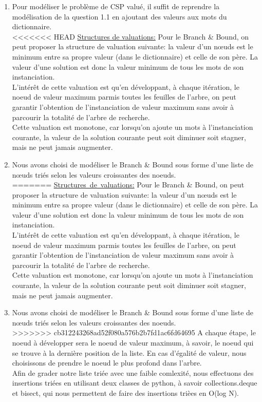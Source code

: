 \documentclass[a4paper,12pt]{report}
\begin{document}
\begin{enumerate}

\item Pour modéliser le problème de CSP valué, il suffit de reprendre la modélisation de la question 1.1 en ajoutant des valeurs aux mots du dictionnaire.\\
<<<<<<< HEAD
\ul{Structures de valuations:} Pour le Branch \& Bound, on peut proposer la structure de valuation suivante: la valeur d'un nœuds est le minimum entre sa propre valeur (dans le dictionnaire) et celle de son père. La valeur d'une solution est donc la valeur minimum de tous les mots de son instanciation.\\
L'intérêt de cette valuation est qu'en développant, à chaque itération, le noeud de valeur maximum parmis toutes les feuilles de l'arbre, on peut garantir l'obtention de l'instanciation de valeur maximum sans avoir à parcourir la totalité de l'arbre de recherche.\\
Cette valuation est monotone, car lorsqu'on ajoute un mots à l'instanciation courante, la valeur de la solution courante peut soit diminuer soit stagner, mais ne peut jamais augmenter.\\

\item Nous avons choisi de modéliser le Branch \& Bound sous forme d'une liste de nœuds triés selon les valeurs croissantes des noeuds.\\
=======
\ul{Structures\ de\ valuations:} Pour le Branch & Bound, on peut proposer la structure de valuation suivante: la valeur d'un nœuds est le minimum entre sa propre valeur (dans le dictionnaire) et celle de son père. La valeur d'une solution est donc la valeur minimum de tous les mots de son instanciation.\\
L'intérêt de cette valuation est qu'en développant, à chaque itération, le noeud de valeur maximum parmis toutes les feuilles de l'arbre, on peut garantir l'obtention de l'instanciation de valeur maximum sans avoir à parcourir la totalité de l'arbre de recherche.\\
Cette valuation est monotone, car lorsqu'on ajoute un mots à l'instanciation courante, la valeur de la solution courante peut soit diminuer soit stagner, mais ne peut jamais augmenter.\\

\item Nous avons choisi de modéliser le Branch & Bound sous forme d'une liste de nœuds triés selon les valeurs croissantes des noeuds.\\
>>>>>>> cb312243268ad52f080a576b2b7fd1ac6fd64695
A chaque étape, le noeud à développer sera le noeud de valeur maximum, à savoir, le noeud qui se trouve à la dernière position de la liste. En cas d'égalité de valeur, nous choisissons de prendre le noeud le plus profond dans l'arbre.\\
Afin de grader notre liste triée avec une faible comlexité, nous effectuons des insertions triées en utilisant deux classes de python, à savoir collections.deque et bisect, qui nous permettent de faire des insertions trièes en O(log N).\\


\end{enumerate}
\end{document}
